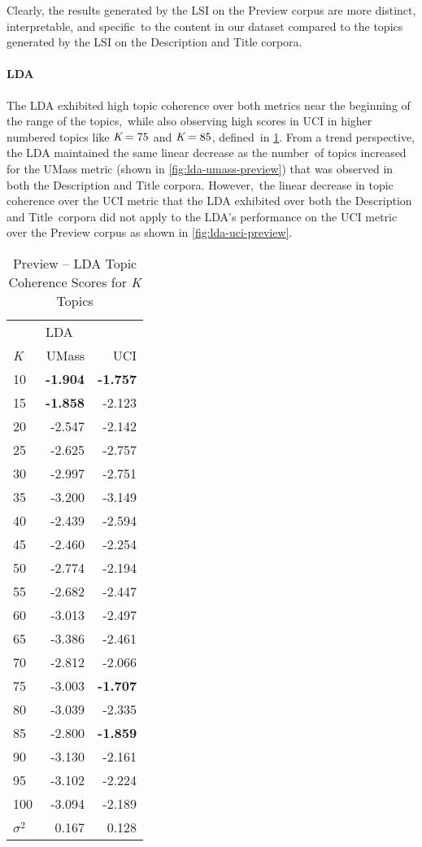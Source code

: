 \documentclass[letterpaper,12pt]{article}
\begin{document}
Clearly, the results generated by the LSI on the Preview corpus are more distinct, interpretable, and specific\
to the content in our dataset compared to the topics generated by the LSI on the Description and Title corpora.
\newpage
\paragraph{LDA}
The LDA exhibited high topic coherence over both metrics near the beginning of the range of the topics,\
while also observing high scores in UCI in higher numbered topics like $\emph{K} = 75$ and $\emph{K} = 85$, defined\
in \ref{tab:lda_preview_tc}. From a trend perspective, the LDA maintained the same linear decrease as the number\
of topics increased for the UMass metric (shown in \ref{fig:lda-umass-preview}) that was observed in both the Description and Title corpora. However,\
the linear decrease in topic coherence over the UCI metric that the LDA exhibited over both the Description and Title\
corpora did not apply to the LDA's performance on the UCI metric over the Preview corpus as shown in \ref{fig:lda-uci-preview}.\

\begin{table}
	\caption{\label{tab:lda_preview_tc} Preview -- LDA Topic Coherence Scores for \emph{K} Topics}
	\begin{center}
		\begin{tabular}{lrr}
			\toprule
			{} & \multicolumn{2}{l}{LDA} \\
			\emph{K} &  UMass &    UCI \\
			\midrule
			10  & \textbf{-1.904} & \textbf{-1.757} \\
			15  & \textbf{-1.858} & -2.123 \\
			20  & -2.547 & -2.142 \\
			25  & -2.625 & -2.757 \\
			30  & -2.997 & -2.751 \\
			35  & -3.200 & -3.149 \\
			40  & -2.439 & -2.594 \\
			45  & -2.460 & -2.254 \\
			50  & -2.774 & -2.194 \\
			55  & -2.682 & -2.447 \\
			60  & -3.013 & -2.497 \\
			65  & -3.386 & -2.461 \\
			70  & -2.812 & -2.066 \\
			75  & -3.003 & \textbf{-1.707} \\
			80  & -3.039 & -2.335 \\
			85  & -2.800 & \textbf{-1.859} \\
			90  & -3.130 & -2.161 \\
			95  & -3.102 & -2.224 \\
			100 & -3.094 & -2.189 \\
			\midrule
			$\sigma^2$ & 0.167 & 0.128 \\
			\bottomrule
			\end{tabular}
	\end{center}
\end{table}
\end{document}
